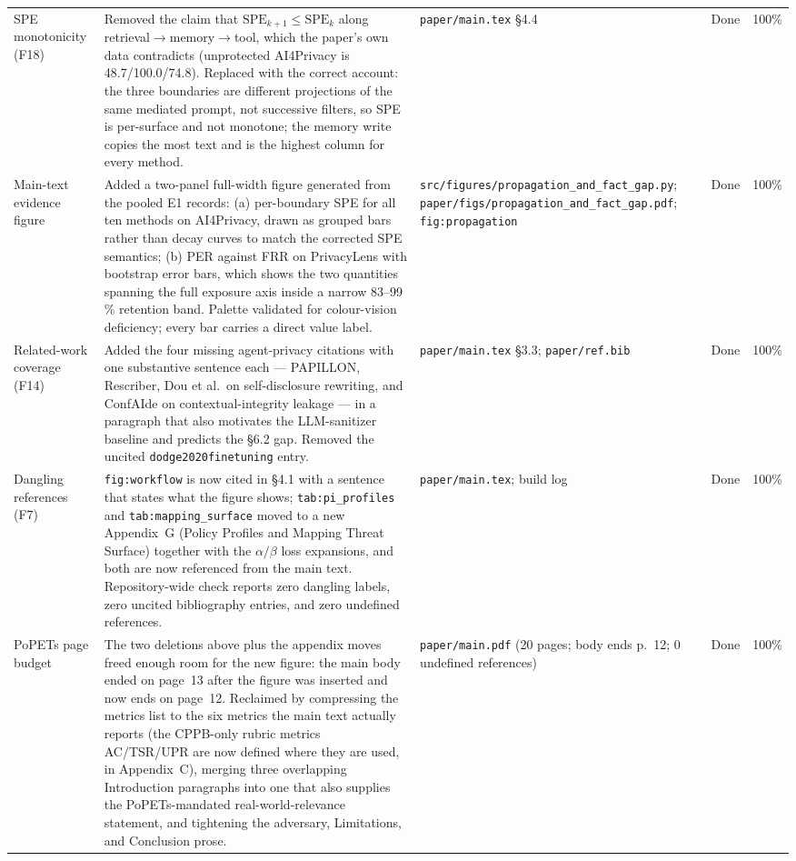 \documentclass[11pt]{article}
\begin{document}
\begin{longtable}{p{}p{}p{}p{}p{}}
SPE monotonicity (F18) & Removed the claim that $\mathrm{SPE}_{k+1}\leq\mathrm{SPE}_{k}$ along retrieval$\rightarrow$memory$\rightarrow$tool, which the paper's own data contradicts (unprotected AI4Privacy is 48.7/100.0/74.8). Replaced with the correct account: the three boundaries are different projections of the same mediated prompt, not successive filters, so SPE is per-surface and not monotone; the memory write copies the most text and is the highest column for every method. & \texttt{paper/main.tex} \S4.4 & Done & 100\% \\
Main-text evidence figure & Added a two-panel full-width figure generated from the pooled E1 records: (a) per-boundary SPE for all ten methods on AI4Privacy, drawn as grouped bars rather than decay curves to match the corrected SPE semantics; (b) PER against FRR on PrivacyLens with bootstrap error bars, which shows the two quantities spanning the full exposure axis inside a narrow 83--99\,\% retention band. Palette validated for colour-vision deficiency; every bar carries a direct value label. & \texttt{src/figures/propagation\_and\_fact\_gap.py}; \texttt{paper/figs/propagation\_and\_fact\_gap.pdf}; \texttt{fig:propagation} & Done & 100\% \\
Related-work coverage (F14) & Added the four missing agent-privacy citations with one substantive sentence each --- PAPILLON, Rescriber, Dou et al.\ on self-disclosure rewriting, and ConfAIde on contextual-integrity leakage --- in a paragraph that also motivates the LLM-sanitizer baseline and predicts the \S6.2 gap. Removed the uncited \texttt{dodge2020finetuning} entry. & \texttt{paper/main.tex} \S3.3; \texttt{paper/ref.bib} & Done & 100\% \\
Dangling references (F7) & \texttt{fig:workflow} is now cited in \S4.1 with a sentence that states what the figure shows; \texttt{tab:pi\_profiles} and \texttt{tab:mapping\_surface} moved to a new Appendix~G (Policy Profiles and Mapping Threat Surface) together with the $\alpha/\beta$ loss expansions, and both are now referenced from the main text. Repository-wide check reports zero dangling labels, zero uncited bibliography entries, and zero undefined references. & \texttt{paper/main.tex}; build log & Done & 100\% \\
PoPETs page budget & The two deletions above plus the appendix moves freed enough room for the new figure: the main body ended on page~13 after the figure was inserted and now ends on page~12. Reclaimed by compressing the metrics list to the six metrics the main text actually reports (the CPPB-only rubric metrics AC/TSR/UPR are now defined where they are used, in Appendix~C), merging three overlapping Introduction paragraphs into one that also supplies the PoPETs-mandated real-world-relevance statement, and tightening the adversary, Limitations, and Conclusion prose. & \texttt{paper/main.pdf} (20 pages; body ends p.~12; 0 undefined references) & Done & 100\% \\

\end{longtable}
\end{document}
